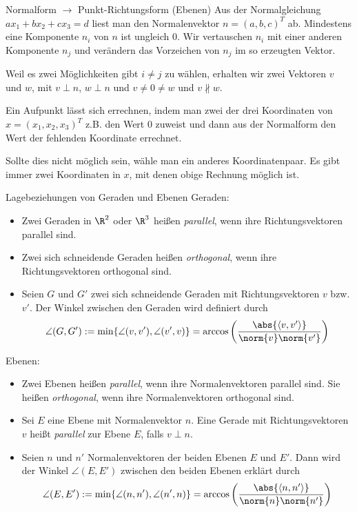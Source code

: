 \documentclass[german]{../spicker}
\newcommand{\scalarprod}[1]{\left\langle #1 \right\rangle}
\begin{document}
\begin{algo}{Normalform $\to$ Punkt-Richtungsform (Ebenen)}
    Aus der Normalgleichung $ax_1 + bx_2 + cx_3 = d$ liest man den Normalenvektor $n = (a, b, c)^T$ ab.
    Mindestens eine Komponente $n_i$ von $n$ ist ungleich $0$.
    Wir vertauschen $n_i$ mit einer anderen Komponente $n_j$ und verändern das Vorzeichen von $n_j$ im so erzeugten Vektor.

    Weil es zwei Möglichkeiten gibt $i \neq j$ zu wählen, erhalten wir zwei Vektoren $v$ und $w$, mit $v \perp n$, $w\perp n$ und $v \neq 0 \neq w$ und $v \not \parallel w$.

    Ein Aufpunkt lässt sich errechnen, indem man zwei der drei Koordinaten von $x = (x_1, x_2, x_3)^T$ z.B. den Wert 0 zuweist und dann aus der Normalform den Wert der fehlenden Koordinate errechnet.

    Sollte dies nicht möglich sein, wähle man ein anderes Koordinatenpaar. Es gibt immer zwei Koordinaten in $x$, mit denen obige Rechnung möglich ist.

\end{algo}

\begin{defi}{Lagebeziehungen von Geraden und Ebenen}
    Geraden:
    \begin{itemize}
        \item Zwei Geraden in $\R^2$ oder $\R^3$ heißen \emph{parallel}, wenn ihre Richtungsvektoren parallel sind.
        \item Zwei sich schneidende Geraden heißen \emph{orthogonal}, wenn ihre Richtungsvektoren orthogonal sind.
        \item Seien $G$ und $G'$ zwei sich schneidende Geraden mit Richtungsvektoren $v$ bzw. $v'$. Der Winkel zwischen den Geraden wird definiert durch
              $$
                  \angle (G, G') := \min \{\angle (v, v'), \angle (v', v)\} = \arccos \left(\frac{\abs{\scalarprod{v, v'}}}{\norm{v} \norm{v'}}\right)
              $$
    \end{itemize}

    Ebenen:
    \begin{itemize}
        \item Zwei Ebenen heißen \emph{parallel}, wenn ihre Normalenvektoren parallel sind. Sie heißen \emph{orthogonal}, wenn ihre Normalenvektoren orthogonal sind.
        \item Sei $E$ eine Ebene mit Normalenvektor $n$. Eine Gerade mit Richtungsvektoren $v$ heißt \emph{parallel} zur Ebene $E$, falls $v \perp n$.
        \item Seien $n$ und $n'$ Normalenvektoren der beiden Ebenen $E$ und $E'$. Dann wird der Winkel $\angle (E, E')$ zwischen den beiden Ebenen erklärt durch
              $$
                  \angle (E, E') := \min \{\angle (n, n'), \angle (n', n)\} = \arccos \left(\frac{\abs{\scalarprod{n, n'}}}{\norm{n} \norm{n'}}\right)
              $$
    \end{itemize}
\end{defi}
\end{document}
